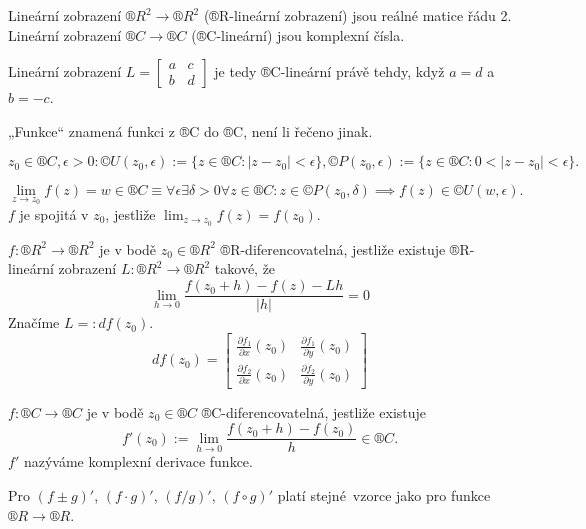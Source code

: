 \documentclass[12pt]{article}					%
\begin{document}
\begin{poznamka}
	Lineární zobrazení $®R^2 \rightarrow ®R^2$ (®R-lineární zobrazení) jsou reálné matice řádu 2. Lineární zobrazení $®C \rightarrow ®C$ (®C-lineární) jsou komplexní čísla.

	Lineární zobrazení $L = \begin{bmatrix} a & c \\ b & d \end{bmatrix}$ je tedy ®C-lineární právě tehdy, když $a = d$ a $b = -c$.
\end{poznamka}

\begin{poznamka}[Úmluva]
	„Funkce“ znamená funkci z ®C do ®C, není li řečeno jinak.
\end{poznamka}

\begin{definice}
	$$ z_0 \in ®C, \epsilon > 0: ©U(z_0, \epsilon):=\{z \in ®C: |z - z_0| < \epsilon\}, ©P(z_0, \epsilon) := \{z \in ®C: 0 < |z - z_0| < \epsilon\}. $$
\end{definice}

\begin{definice}
	$$ \lim_{z \rightarrow z_0} f(z) = w \in ®C ≡ \forall \epsilon \exists \delta > 0 \forall z \in ®C: z \in ©P(z_0, \delta) \implies f(z) \in ©U(w, \epsilon). $$
	$f$ je spojitá v $z_0$, jestliže $\lim_{z \rightarrow z_0} f(z) = f(z_0)$.
\end{definice}

\begin{definice}[Derivace]
	$f: ®R^2 \rightarrow ®R^2$ je v bodě $z_0 \in ®R^2$ ®R-diferencovatelná, jestliže existuje ®R-lineární zobrazení $L: ®R^2 \rightarrow ®R^2$ takové, že
	$$ \lim_{h \rightarrow 0} \frac{f(z_0 + h) - f(z) - Lh}{|h|} = 0 $$
	Značíme $L =: df(z_0)$.
	$$ df(z_0) = \begin{bmatrix} \frac{\partial f_1}{\partial x}(z_0) & \frac{\partial f_1}{\partial y}(z_0) \\ \frac{\partial f_2}{\partial x}(z_0) & \frac{\partial f_2}{\partial y}(z_0) \end{bmatrix}  $$

	$f: ®C \rightarrow ®C$ je v bodě $z_0 \in ®C$ ®C-diferencovatelná, jestliže existuje
	$$ f'(z_0) := \lim_{h \rightarrow 0} \frac{f(z_0 + h) - f(z_0)}{h} \in ®C. $$
	$f'$ nazýváme komplexní derivace funkce.
\end{definice}

\begin{poznamka}
	Pro $(f±g)'$, $(f·g)'$, $(f / g)'$, $(f \circ g)'$ platí stejné vzorce jako pro funkce $®R \rightarrow ®R$.
\end{poznamka}
\end{document}

